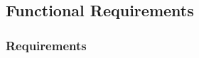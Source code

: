 \subsection{Functional Requirements}




    




\subsubsection{Requirements}
\begin{itemize}


\end{itemize}
